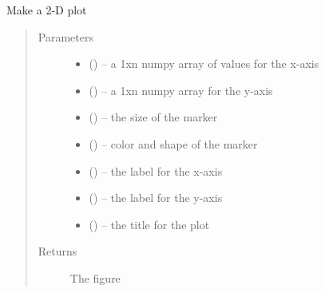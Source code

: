 \documentclass[letterpaper,10pt,english]{sphinxmanual}
\begin{document}
\begin{fulllineitems}
\label{\detokenize{Plot:pyleoclim.Plot.plot}}
Make a 2-D plot
\begin{quote}\begin{description}
\item[{Parameters}] \leavevmode\begin{itemize}
\item {} 
 () -- a 1xn numpy array of values for the x-axis

\item {} 
 () -- a 1xn numpy array for the y-axis

\item {} 
 () -- the size of the marker

\item {} 
 () -- color and shape of the marker

\item {} 
 () -- the label for the x-axis

\item {} 
 () -- the label for the y-axis

\item {} 
 () -- the title for the plot

\end{itemize}

\item[{Returns}] \leavevmode
The figure

\end{description}\end{quote}

\end{fulllineitems}

\end{document}
